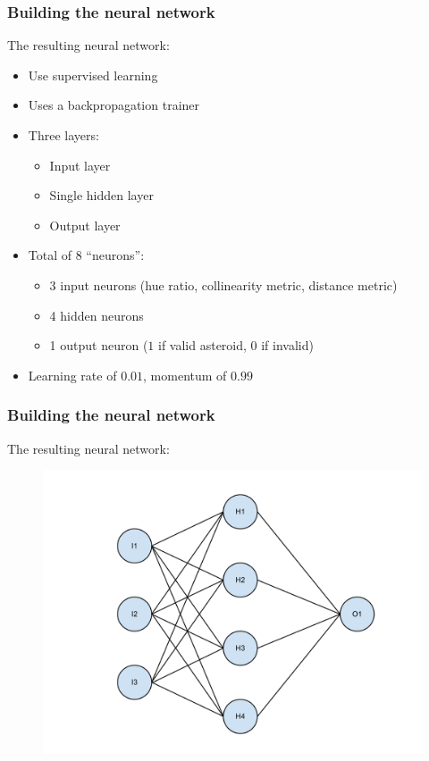 \documentclass{beamer}
\begin{document}
\begin{frame}
    \frametitle{Building the neural network}
    The resulting neural network:
    \begin{itemize}
        \item Use supervised learning
        \item Uses a backpropagation trainer
        \item Three layers:
        \begin{itemize}
            \item Input layer
            \item Single hidden layer
            \item Output layer
        \end{itemize}
        \item Total of 8 ``neurons'':
        \begin{itemize}
            \item 3 input neurons (hue ratio, collinearity metric, distance
            metric)
            \item 4 hidden neurons
            \item 1 output neuron ($1$ if valid asteroid, $0$ if invalid)
        \end{itemize}
        \item Learning rate of $0.01$, momentum of $0.99$
    \end{itemize}
\end{frame}

\begin{frame}
    \frametitle{Building the neural network}
    The resulting neural network:
    \begin{figure}
        \centering
        \includegraphics[height=0.8\paperheight]{nn.pdf}
    \end{figure}
\end{frame}
\end{document}

